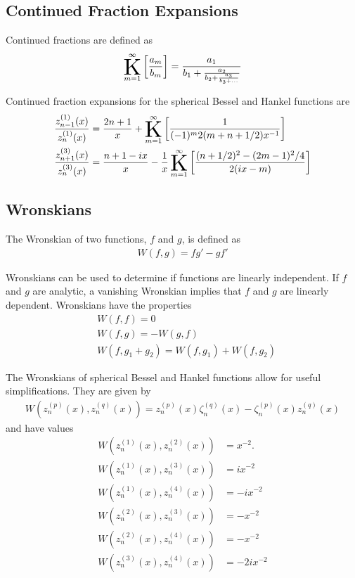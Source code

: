 \subsection{Continued Fraction Expansions}
%
Continued fractions are defined as
\begin{align}
\K_{m=1}^{\infty} \left[ \frac{a_{m}}{b_{m}} \right] = \frac{ a_{1} }{ b_{1} + \frac{ a_{2} }{ b_{2} + \frac{ a_{3} }{ b_{3} + \dotsc } } }
\end{align}

Continued fraction expansions for the spherical Bessel\cite{Lentz1976} and Hankel\cite{Cuyt2008} functions are
%
\begin{subequations}
\begin{align}
\frac{z_{n-1}^{(1)}(x)}{z_{n}^{(1)}(x)} &= \frac{2n+1}{x} + \K_{m=1}^{\infty} \left[ \frac{1}{(-1)^{m}2(m + n + 1/2)x^{-1}} \right]
\\
\frac{z_{n+1}^{(3)}(x)}{z_{n}^{(3)}(x)} &= \frac{n + 1 - ix}{x} - \frac{1}{x} \K_{m=1}^{\infty} \left[ \frac{(n+1/2)^{2} - (2m-1)^{2}/4}{2(ix-m)} \right] \label{eq:ContFracHankel}
\end{align}
\end{subequations}

\subsection{Wronskians}
The Wronskian of two functions, $f$ and $g$, is defined as
\begin{align}
W(f,g) = f g' - g f'
\end{align}

Wronskians can be used to determine if functions are linearly independent. If $f$ and $g$ are analytic, a vanishing Wronskian implies that $f$ and $g$ are linearly dependent. Wronskians have the properties
\begin{align}
& W(f,f) = 0
\\
& W(f,g) = - W(g,f)
\\
& W(f, g_{1} + g_{2}) = W(f,g_{1}) + W(f,g_{2})
\end{align}

The Wronskians of spherical Bessel and Hankel functions allow for useful simplifications. They are given by
\begin{align}
W(z_{n}^{(p)}(x), z_{n}^{(q)}(x)) = z_{n}^{(p)}(x) \zeta_{n}^{(q)}(x) - \zeta_{n}^{(p)}(x) z_{n}^{(q)}(x)
\end{align}
%
and have values\cite{Olver2017}
%
\begin{subequations}
\begin{align}
W(z_{n}^{(1)}(x), z_{n}^{(2)}(x)) &= x^{-2}.
\\
W(z_{n}^{(1)}(x), z_{n}^{(3)}(x)) &= i x^{-2}
\\
W(z_{n}^{(1)}(x), z_{n}^{(4)}(x)) &= -i x^{-2}
\\
W(z_{n}^{(2)}(x), z_{n}^{(3)}(x)) &= - x^{-2}
\\
W(z_{n}^{(2)}(x), z_{n}^{(4)}(x)) &= - x^{-2}
\\
W(z_{n}^{(3)}(x), z_{n}^{(4)}(x)) &= -2 i x^{-2}
\end{align}
\end{subequations}

